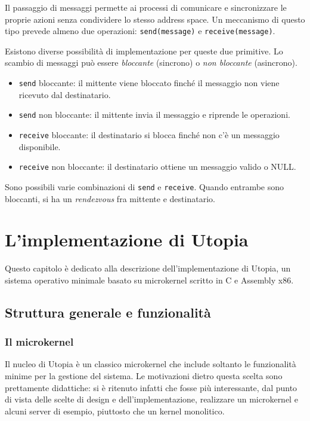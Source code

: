 \documentclass[12pt,a4paper]{report}
\begin{document}
			Il passaggio di messaggi permette ai processi di comunicare e sincronizzare le proprie
			azioni senza condividere lo stesso address space.
			Un meccanismo di questo tipo prevede almeno due operazioni:
			\texttt{send(message)} e \texttt{receive(message)}.
			
			Esistono diverse possibilità di implementazione per queste due primitive. Lo scambio di messaggi può
			essere \emph{bloccante} (sincrono) o \emph{non bloccante} (asincrono).
			\begin{itemize}
				\item \texttt{send} bloccante: il mittente viene bloccato finché il messaggio non viene ricevuto dal destinatario.
				\item \texttt{send} non bloccante: il mittente invia il messaggio e riprende le operazioni.
				\item \texttt{receive} bloccante: il destinatario si blocca finché non c'è un messaggio disponibile.
				\item \texttt{receive} non bloccante: il destinatario ottiene un messaggio valido o NULL.
			\end{itemize}
			Sono possibili varie combinazioni di \texttt{send} e \texttt{receive}. Quando entrambe sono bloccanti,
			si ha un \emph{rendezvous} fra mittente e destinatario. \cite{Silberschatz}
				
\chapter{L'implementazione di Utopia}
	Questo capitolo è dedicato alla descrizione dell'implementazione di Utopia, un sistema operativo
	minimale basato su microkernel scritto in C e Assembly x86.
	
	\section{Struttura generale e funzionalità}
		\subsection{Il microkernel}
			Il nucleo di Utopia è un classico microkernel che include soltanto le funzionalità minime per
			la gestione del sistema.
			Le motivazioni dietro questa scelta sono prettamente didattiche: si è ritenuto infatti che fosse
			più interessante, dal punto di vista delle scelte di design e dell'implementazione, realizzare
			un microkernel e alcuni server di esempio, piuttosto che un kernel monolitico.
		
\end{document}
